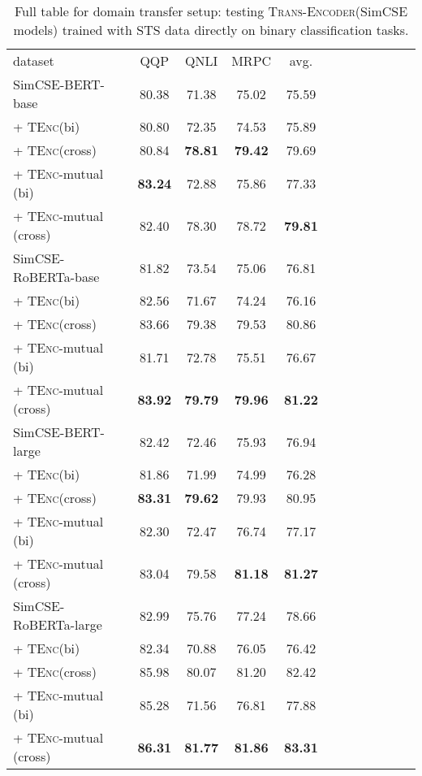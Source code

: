 \documentclass{article} \usepackage{iclr2021_conference,times}
\newcommand{\modelname}{\textsc{Trans-Encoder}\xspace}
\newcommand{\tenc}{\textsc{TEnc}\xspace}
\begin{document}
\begin{table}[!t] \setlength{\tabcolsep}{3.6pt}
\centering
\begin{tabular}{lccccccccccc}
\cmidrule[1.5pt]{1-10}
 dataset  & QQP & QNLI & MRPC & avg.\\
\cmidrule[1.0pt]{1-10}
  SimCSE-BERT-base & 80.38 & 71.38 & 75.02 & 75.59  \\
  + \tenc (bi) & 80.80 &  72.35 &  74.53 & 75.89 \\
   + \tenc (cross) & 80.84 & \textbf{78.81} & \textbf{79.42} & 79.69 \\
      \rowcolor{blue!5}
   + \tenc-mutual (bi) & \textbf{83.24} &  72.88 & 75.86 & 77.33 \\
      \rowcolor{blue!5}
   + \tenc-mutual (cross) & 82.40 & 78.30 & 78.72 & \textbf{79.81} \\
\hdashline
  SimCSE-RoBERTa-base & 81.82 & 73.54 & 75.06 & 76.81  \\
 + \tenc (bi) & 82.56 & 71.67 & 74.24 & 76.16 \\
   + \tenc (cross) & 83.66 & 79.38 & 79.53 & 80.86 \\
    \rowcolor{blue!5}
  + \tenc-mutual (bi) & 81.71 & 72.78 & 75.51 & 76.67 \\
    \rowcolor{blue!5}
 + \tenc-mutual (cross) & \textbf{83.92} & \textbf{79.79} & \textbf{79.96} & \textbf{81.22} \\
 \cmidrule[.5pt]{1-10}
  SimCSE-BERT-large & 82.42 & 72.46 & 75.93 & 76.94  \\
   + \tenc (bi) & 81.86 & 71.99 & 74.99 & 76.28 \\
   + \tenc (cross) & \textbf{83.31} & \textbf{79.62} & 79.93 & 80.95 \\
    \rowcolor{red!5}
 + \tenc-mutual (bi) & 82.30 & 72.47 & 76.74 & 77.17 \\
  \rowcolor{red!5}
 + \tenc-mutual (cross) & 83.04 & 79.58 & \textbf{81.18} & \textbf{81.27} \\
\hdashline
 SimCSE-RoBERTa-large & 82.99 & 75.76 & 77.24 & 78.66 \\
 + \tenc (bi)  & 82.34 & 70.88 & 76.05 & 76.42 \\
 + \tenc (cross) & 85.98 & 80.07 & 81.20 & 82.42 \\
    \rowcolor{red!5}
 + \tenc-mutual (bi) & 85.28 & 71.56 & 76.81 & 77.88  \\
   \rowcolor{red!5}
 + \tenc-mutual (cross) & \textbf{86.31} &  \textbf{81.77} & \textbf{81.86} & \textbf{83.31} \\
  \cmidrule[1.5pt]{1-10}
\end{tabular}
\caption{Full table for domain transfer setup: testing \modelname (SimCSE models) trained with STS data directly on binary classification tasks. }
\label{tab:binary_transfer_full}
\end{table}
\end{document}
